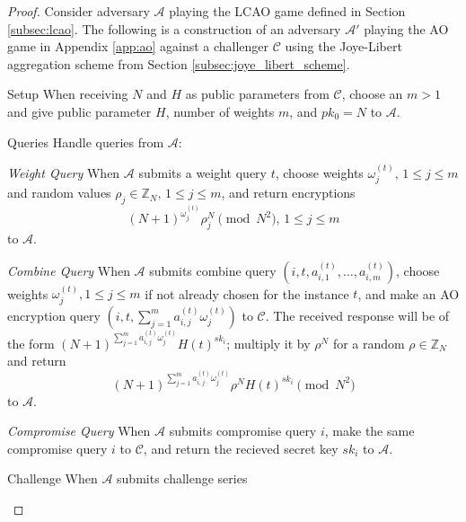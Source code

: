 \documentclass[10pt,letterpaper,oneside,twocolumn,journal]{IEEEtran}
\theoremstyle{definition}
\theoremstyle{definition}
\theoremstyle{remark}
\begin{document}
\begin{proof}
    Consider adversary $\mathcal{A}$ playing the LCAO game defined in Section \ref{subsec:lcao}. The following is a construction of an adversary $\mathcal{A}'$ playing the AO game in Appendix \ref{app:ao} against a challenger $\mathcal{C}$ using the Joye-Libert aggregation scheme from Section \ref{subsec:joye_libert_scheme}.
    \begin{LaTeXdescription}
        \item[Setup] When receiving $N$ and $H$ as public parameters from $\mathcal{C}$, choose an $m>1$ and give public parameter $H$, number of weights $m$, and $pk_0=N$ to $\mathcal{A}$.
        \item[Queries] Handle queries from $\mathcal{A}$:
        \begin{LaTeXdescription}
            \item[\textit{Weight Query}] When $\mathcal{A}$ submits a weight query $t$, choose weights $\omega^{(t)}_j,\,1 \leq j \leq m$ and random values $\rho_j \in \mathbb{Z}_N,\,1 \leq j \leq m$, and return encryptions 
            \begin{equation*}
                (N+1)^{\omega^{(t)}_{j}}\rho_j^N\pmod{N^2},\,1\leq j\leq m
            \end{equation*}
            to $\mathcal{A}$.
            \item[\textit{Combine Query}] When $\mathcal{A}$ submits combine query $(i, t, a^{(t)}_{i,1},\dots,a^{(t)}_{i,m})$, choose weights $\omega^{(t)}_j,1 \leq j \leq m$ if not already chosen for the instance $t$, and make an AO encryption query $(i, t, \sum^m_{j=1}a^{(t)}_{i,j}\omega^{(t)}_j)$ to $\mathcal{C}$. The received response will be of the form $(N+1)^{\sum^m_{j=1}a^{(t)}_{i,j}\omega^{(t)}_j}H(t)^{sk_i}$; multiply it by $\rho^N$ for a random $\rho \in \mathbb{Z}_N$ and return 
            \begin{equation*}
                (N+1)^{\sum^m_{j=1}a^{(t)}_{i,j}\omega^{(t)}_j}\rho^N H(t)^{sk_i} \pmod{N^2}
            \end{equation*}
            to $\mathcal{A}$.
            \item[\textit{Compromise Query}] When $\mathcal{A}$ submits compromise query $i$, make the same compromise query $i$ to $\mathcal{C}$, and return the recieved secret key $sk_i$ to $\mathcal{A}$.
        \end{LaTeXdescription}
        \item[Challenge] When $\mathcal{A}$ submits challenge series
        \begin{equation*}

\end{equation*}
\end{LaTeXdescription}
\end{proof}
\end{document}
